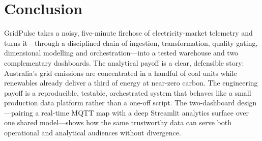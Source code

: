 \documentclass[onecolumn,11pt]{IEEEtran}
\begin{document}
\section{Conclusion}\label{sec:concl}
GridPulse takes a noisy, five-minute firehose of electricity-market telemetry and
turns it---through a disciplined chain of ingestion, transformation, quality
gating, dimensional modelling and orchestration---into a tested warehouse and two
complementary dashboards. The analytical payoff is a clear, defensible story:
Australia's grid emissions are concentrated in a handful of coal units while
renewables already deliver a third of energy at near-zero carbon. The
engineering payoff is a reproducible, testable, orchestrated system that behaves
like a small production data platform rather than a one-off script. The
two-dashboard design---pairing a real-time MQTT map with a deep Streamlit
analytics surface over one shared model---shows how the same trustworthy data can
serve both operational and analytical audiences without divergence.
\end{document}
